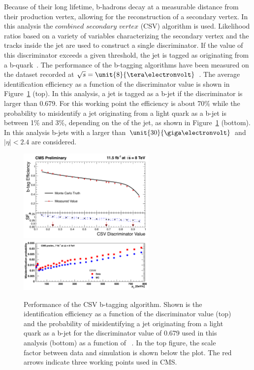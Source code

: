 Because of their long lifetime, b-hadrons decay at a measurable distance from their production vertex, allowing for the reconstruction of a secondary vertex. In this analysis the $\textit{combined}$ $\textit{secondary}$ $\textit{vertex}$ (CSV) algorithm is used. Likelihood ratios based on a variety of variables characterizing the secondary vertex and the tracks inside the jet are used to construct a single discriminator. If the value of this discriminator exceeds a given threshold, the jet is tagged as originating from a b-quark~\cite{Chatrchyan:2012jua}. The performance of the b-tagging algorithms have been measured on the dataset recorded at $\sqrt{s} = \unit{8}{\tera\electronvolt}$~\cite{CMS-DP-2013-005}. The average identification efficiency as a function of the discriminator value is shown in Figure~\ref{fig:bTagging} (top). In this analysis, a jet is tagged as a b-jet if the discriminator is larger than 0.679. For this working point the efficiency is about 70\% while the probability to misidentify a jet originating from a light quark as a b-jet is between 1\% and 3\%, depending on the \pt of the jet, as shown in Figure~\ref{fig:bTagging} (bottom). In this analysis b-jets with a \pt larger than $\unit{30}{\giga\electronvolt}$ and $|\eta| < 2.4$ are considered. 
\begin{figure}[htbp]
\centering

\includegraphics[width=0.6\textwidth]{plots/RECO/bTagEfficiency.png}\\

\includegraphics[width=0.6\textwidth]{plots/RECO/bTagMisID.png}\\

\caption{Performance of the CSV b-tagging algorithm. Shown is the identification efficiency as a function of the discriminator value (top) and the probability of misidentifying a jet originating from a light quark as a b-jet for the discriminator value of 0.679 used in this analysis (bottom) as a function of \pt~\cite{CMS-DP-2013-005}. In the top figure, the scale factor between data and simulation is shown below the plot. The red arrows indicate three working points used in CMS.}
\label{fig:bTagging}
\end{figure} 

